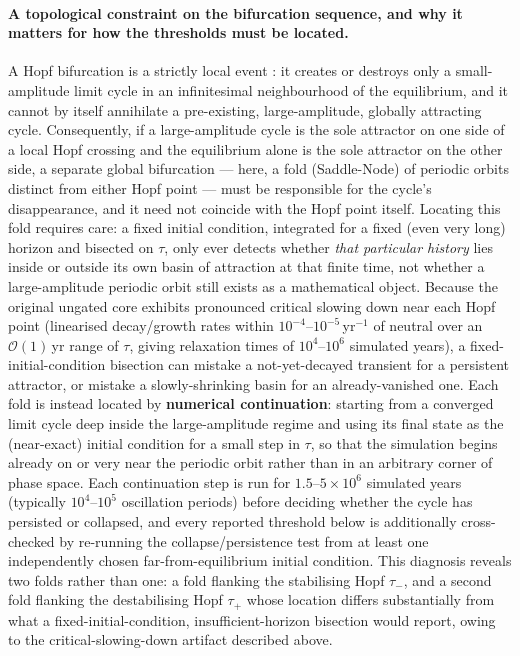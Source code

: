 \documentclass[twocolumn,10pt]{article}
\begin{document}
\paragraph{A topological constraint on the bifurcation sequence, and why it matters for how the thresholds must be located.} A Hopf bifurcation is a strictly local event \cite{guckenheimer1983,hassard1981}: it creates or destroys only a small-amplitude limit cycle in an infinitesimal neighbourhood of the equilibrium, and it cannot by itself annihilate a pre-existing, large-amplitude, globally attracting cycle. Consequently, if a large-amplitude cycle is the sole attractor on one side of a local Hopf crossing and the equilibrium alone is the sole attractor on the other side, a separate global bifurcation — here, a fold (Saddle-Node) of periodic orbits distinct from either Hopf point — must be responsible for the cycle's disappearance, and it need not coincide with the Hopf point itself. Locating this fold requires care: a fixed initial condition, integrated for a fixed (even very long) horizon and bisected on $\tau$, only ever detects whether \emph{that particular history} lies inside or outside its own basin of attraction at that finite time, not whether a large-amplitude periodic orbit still exists as a mathematical object. Because the original ungated core exhibits pronounced critical slowing down \cite{scheffer2009,carpenter2011,lindegren2012} near each Hopf point (linearised decay/growth rates within $10^{-4}$--$10^{-5}$\,yr$^{-1}$ of neutral over an $\mathcal{O}(1)$\,yr range of $\tau$, giving relaxation times of $10^4$--$10^6$ simulated years), a fixed-initial-condition bisection can mistake a not-yet-decayed transient for a persistent attractor, or mistake a slowly-shrinking basin for an already-vanished one. Each fold is instead located by \textbf{numerical continuation}: starting from a converged limit cycle deep inside the large-amplitude regime and using its final state as the (near-exact) initial condition for a small step in $\tau$, so that the simulation begins already on or very near the periodic orbit rather than in an arbitrary corner of phase space. Each continuation step is run for $1.5$--$5\times10^{6}$ simulated years (typically $10^4$--$10^5$ oscillation periods) before deciding whether the cycle has persisted or collapsed, and every reported threshold below is additionally cross-checked by re-running the collapse/persistence test from at least one independently chosen far-from-equilibrium initial condition. This diagnosis reveals two folds rather than one: a fold flanking the stabilising Hopf $\tau_-$, and a second fold flanking the destabilising Hopf $\tau_+$ whose location differs substantially from what a fixed-initial-condition, insufficient-horizon bisection would report, owing to the critical-slowing-down artifact described above.
\end{document}
